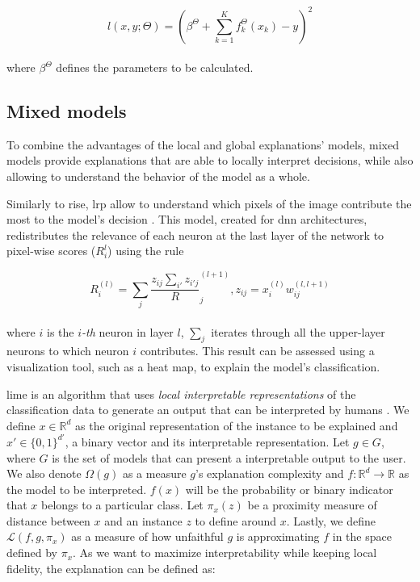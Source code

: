 \begin{equation}
l(x,y;\Theta) = (\beta^\Theta +  \sum_{k=1}^K f_k^\Theta(x_k) - y)^2
\end{equation}
\\
where $\beta^\Theta$ defines the parameters to be calculated. 


\subsection{Mixed models}

To combine the advantages of the local and global explanations' models, mixed models provide explanations that are able to locally interpret decisions, while also allowing to understand the behavior of the model as a whole.

Similarly to  \gls{rise}, \gls{lrp} allow to understand which pixels of the image contribute the most to the model's decision \cite{LRP}. This model, created for \gls{dnn} architectures, redistributes the relevance of each neuron at the last layer of the network to pixel-wise scores ($R_{i}^{l}$) using the rule

\begin{equation}
R_i^{(l)} = \sum_j \dfrac{z_{ij}{\sum_{i'} z_{i'j}}} R_{j}^{(l+1)} , z_{ij} = x_i^{(l)}w_{ij}^{(l,l+1)}
\end{equation}
\\
where $i$ is the $i$\textit{-th} neuron in layer $l$, $\sum_j$ iterates through all the upper-layer neurons to which neuron $i$ contributes. This result can be assessed using a visualization tool, such as a heat map, to explain the model's classification.

\gls{lime} is an algorithm that uses \textit{local interpretable representations} of the classification data to generate an output that can be interpreted by humans \cite{LIME}. 
We define $x \in \mathbb{R}^d$ as the original representation of the instance to be explained and $x' \in \{0,1\}^{d'}$, a binary vector and its interpretable representation. Let $g \in G$, where $G$ is the set of models that can present a interpretable output to the user. We also denote $\Omega(g)$ as a measure $g$'s explanation complexity and $ f: \mathbb{R}^d \rightarrow \mathbb{R}$ as the model to be interpreted. $f(x)$ will be the probability or binary indicator that $x$ belongs to a particular class. Let $\pi_x(z)$ be a proximity measure of distance between $x$ and an instance $z$ to define around $x$. Lastly, we define $\mathcal{L}(f,g,\pi_x)$ as a measure of how unfaithful $g$ is approximating $f$ in the space defined by $\pi_x$. As we want to maximize interpretability while keeping local fidelity, the explanation can be defined as:

